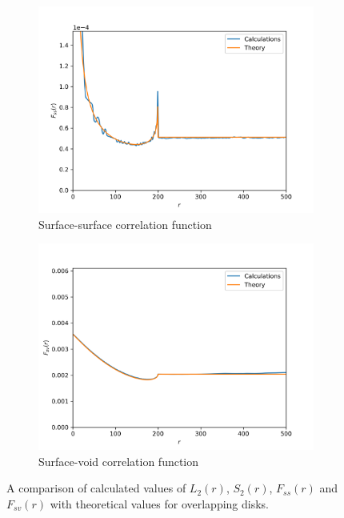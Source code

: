 \documentclass[reprint,amsmath,amssymb,aps,pre]{revtex4-1}
\begin{document}
\begin{figure}[t]
\begin{subfigure}[b]{0.475\textwidth}
    \centering
    \includegraphics[width=\textwidth]{images/ss-2d.png}
    \caption[]{{\small Surface-surface correlation function}}
    \label{fig:ss-2d}
  \end{subfigure}
  \hfill
  \begin{subfigure}[b]{0.475\textwidth}
    \centering
    \includegraphics[width=\textwidth]{images/sv-2d.png}
    \caption[]{{\small Surface-void correlation function}}
    \label{fig:sv-2d}
  \end{subfigure}
  \caption[]{\small A comparison of calculated values of $L_2(r)$, $S_2(r)$,
    $F_{ss}(r)$ and $F_{sv}(r)$ with theoretical values for overlapping disks.}
  \label{fig:2d}
\end{figure}
\end{document}
